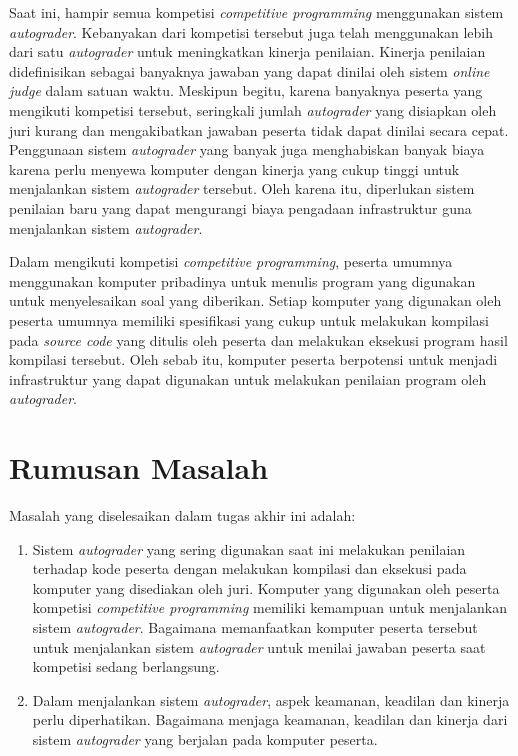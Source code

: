 \par Saat ini, hampir semua kompetisi \textit{competitive programming} menggunakan sistem \textit{autograder}. Kebanyakan dari kompetisi tersebut juga telah menggunakan lebih dari satu \textit{autograder} untuk meningkatkan kinerja penilaian. Kinerja penilaian didefinisikan sebagai banyaknya jawaban yang dapat dinilai oleh sistem \textit{online judge} dalam satuan waktu. Meskipun begitu, karena banyaknya peserta yang mengikuti kompetisi tersebut, seringkali jumlah \textit{autograder} yang disiapkan oleh juri kurang dan mengakibatkan jawaban peserta tidak dapat dinilai secara cepat. Penggunaan sistem \textit{autograder} yang banyak juga menghabiskan banyak biaya karena perlu menyewa komputer dengan kinerja yang cukup tinggi untuk menjalankan sistem \textit{autograder} tersebut. Oleh karena itu, diperlukan sistem penilaian baru yang dapat mengurangi biaya pengadaan infrastruktur guna menjalankan sistem \textit{autograder}.

\par Dalam mengikuti kompetisi \textit{competitive programming}, peserta umumnya menggunakan komputer pribadinya untuk menulis program yang digunakan untuk menyelesaikan soal yang diberikan. Setiap komputer yang digunakan oleh peserta umumnya memiliki spesifikasi yang cukup untuk melakukan kompilasi pada \textit{source code} yang ditulis oleh peserta dan melakukan eksekusi program hasil kompilasi tersebut. Oleh sebab itu, komputer peserta berpotensi untuk menjadi infrastruktur yang dapat digunakan untuk melakukan penilaian program oleh \textit{autograder}.

\section{Rumusan Masalah}

\par Masalah yang diselesaikan dalam tugas akhir ini adalah:
\begin{enumerate}

	\item Sistem \textit{autograder} yang sering digunakan saat ini melakukan penilaian terhadap kode peserta dengan melakukan kompilasi dan eksekusi pada komputer yang disediakan oleh juri. Komputer yang digunakan oleh peserta kompetisi \textit{competitive programming} memiliki kemampuan untuk menjalankan sistem \textit{autograder}. Bagaimana memanfaatkan komputer peserta tersebut untuk menjalankan sistem \textit{autograder} untuk menilai jawaban peserta saat kompetisi sedang berlangsung.
	
	\item Dalam menjalankan sistem \textit{autograder}, aspek keamanan, keadilan dan kinerja perlu diperhatikan. Bagaimana menjaga keamanan, keadilan dan kinerja dari sistem \textit{autograder} yang berjalan pada komputer peserta.

\end{enumerate}

